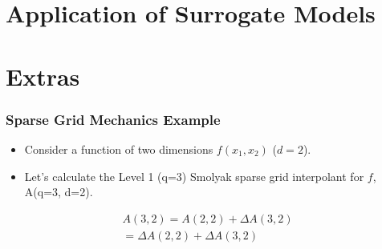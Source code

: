 \documentclass{beamer}
\begin{document}





\section{Application of Surrogate Models}

\section{Extras}

\begin{frame}
\frametitle{Sparse Grid Mechanics Example}

\begin{itemize}
  \item Consider a function of two dimensions $f(x_1, x_2)$ ($d=2$). 
  \item Let's calculate the Level 1 (q=3) Smolyak sparse grid interpolant for $f$, A(q=3, d=2).
\end{itemize}

\begin{equation}
\begin{array}{c}
 A(3,2) = A(2,2) + \Delta A(3,2) \\
 = \Delta A(2,2) + \Delta A(3,2)
\end{array} \nonumber
\end{equation}

\end{frame}
\end{document}
